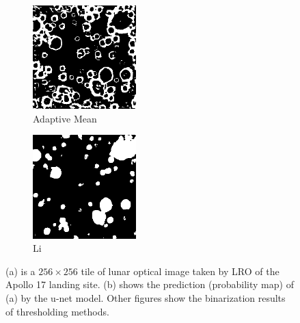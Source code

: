 \documentclass[11pt]{article}
\begin{document}
\begin{figure}[H]
\begin{subfigure}{5cm}
		\centering
		\includegraphics[width=4cm]{files/results/adaptiveMean_mean.png}
		\caption{Adaptive Mean}\hfill
	\end{subfigure}
	\begin{subfigure}[b]{1.0\textwidth}
		\centering
		\includegraphics[width=4cm]{files/results/li.png}
		\caption{Li}\hfill
	\end{subfigure}
\caption{(a) is a $256 \times 256$ tile of lunar optical image taken by LRO of the Apollo 17 landing site. (b) shows the prediction (probability map) of (a) by the u-net model. Other figures show the binarization results of thresholding methods.}
\label{thresholding}
	
\end{figure}
\end{document}
